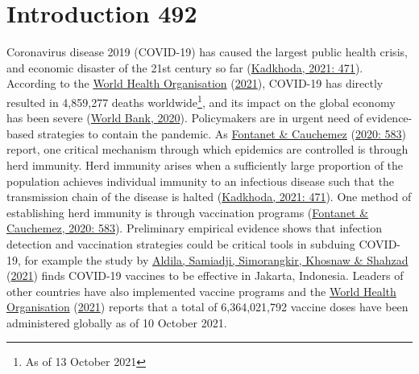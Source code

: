 \documentclass[11pt,preprint, authoryear]{elsarticle}
\numberwithin{equation}{section}
\numberwithin{figure}{section}
\numberwithin{table}{section}
\let\rmarkdownfootnote\footnote%
\def\footnote{\protect\rmarkdownfootnote}
\begin{document}
\renewcommand{\contentsname}{Table of Contents}
{\tableofcontents}

\pagestyle{fancy}
\chead{}
\rhead{}
\lfoot{}
\lhead{}
\cfoot{}


\headsep 35pt %




\newpage

\hypertarget{introduction-492}{%
\section{\texorpdfstring{Introduction \label{Introduction}
492}{Introduction  492}}\label{introduction-492}}

Coronavirus disease 2019 (COVID-19) has caused the largest public health
crisis, and economic disaster of the 21st century so far
(\protect\hyperlink{ref-bad}{Kadkhoda, 2021: 471}). According to the
\protect\hyperlink{ref-who}{World Health Organisation}
(\protect\hyperlink{ref-who}{2021}), COVID-19 has directly resulted in
4,859,277 deaths worldwide\footnote{As of 13 October 2021}, and its
impact on the global economy has been severe
(\protect\hyperlink{ref-bank}{World Bank, 2020}). Policymakers are in
urgent need of evidence-based strategies to contain the pandemic. As
\protect\hyperlink{ref-immun}{Fontanet \& Cauchemez}
(\protect\hyperlink{ref-immun}{2020: 583}) report, one critical
mechanism through which epidemics are controlled is through herd
immunity. Herd immunity arises when a sufficiently large proportion of
the population achieves individual immunity to an infectious disease
such that the transmission chain of the disease is halted
(\protect\hyperlink{ref-bad}{Kadkhoda, 2021: 471}). One method of
establishing herd immunity is through vaccination programs
(\protect\hyperlink{ref-immun}{Fontanet \& Cauchemez, 2020: 583}).
Preliminary empirical evidence shows that infection detection and
vaccination strategies could be critical tools in subduing COVID-19, for
example the study by \protect\hyperlink{ref-erad}{Aldila, Samiadji,
Simorangkir, Khosnaw \& Shahzad} (\protect\hyperlink{ref-erad}{2021})
finds COVID-19 vaccines to be effective in Jakarta, Indonesia. Leaders
of other countries have also implemented vaccine programs and the
\protect\hyperlink{ref-who}{World Health Organisation}
(\protect\hyperlink{ref-who}{2021}) reports that a total of
6,364,021,792 vaccine doses have been administered globally as of 10
October 2021.
\end{document}
